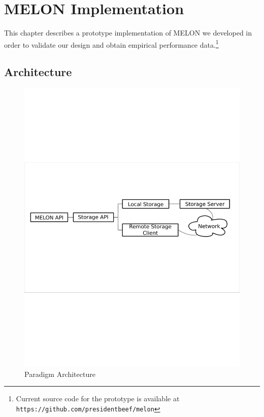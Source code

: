 \chapter{MELON Implementation}\label{chapter:implementation}

This chapter describes a prototype implementation of MELON we developed in order to validate our design and obtain empirical performance data.\footnote{Current source code for the prototype is available at \texttt{https://github.com/presidentbeef/melon}}

\section{Architecture}

\begin{figure}
\centering
\includegraphics[scale = .70, clip, trim = 10px 280px 10px 250px]{figures/paradigm_arch.pdf}
\caption{Paradigm Architecture}
\label{fig:architecture}
\end{figure}

